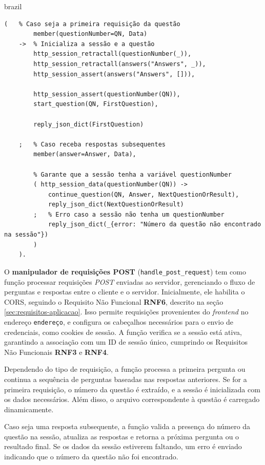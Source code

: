 \begin{otherlanguage*}{brazil}
\begin{lstlisting}[style=ufscthesisx_style, caption={Arquivo \textit{server.pl} - \textit{Handlers} e Manipuladores de requisições}]
    (   % Caso seja a primeira requisição da questão
        member(questionNumber=QN, Data) 
    ->  % Inicializa a sessão e a questão
        http_session_retractall(questionNumber(_)),
        http_session_retractall(answers("Answers", _)),
        http_session_assert(answers("Answers", [])),
        
        http_session_assert(questionNumber(QN)),
        start_question(QN, FirstQuestion),

        reply_json_dict(FirstQuestion)

    ;   % Caso receba respostas subsequentes
        member(answer=Answer, Data),
        
        % Garante que a sessão tenha a variável questionNumber
        ( http_session_data(questionNumber(QN)) ->
            continue_question(QN, Answer, NextQuestionOrResult),
            reply_json_dict(NextQuestionOrResult)
        ;   % Erro caso a sessão não tenha um questionNumber
            reply_json_dict(_{error: "Número da questão não encontrado na sessão"})
        )
    ).
\end{lstlisting}    

O \textbf{manipulador de requisições POST} (\texttt{handle\_post\_request}) tem como função processar requisições \textit{POST} enviadas ao servidor, gerenciando o fluxo de perguntas e respostas entre o cliente e o servidor. Inicialmente, ele habilita o CORS, seguindo o Requisito Não Funcional \textbf{RNF6}, descrito na seção \ref{sec:requisitos-aplicacao}. Isso permite requisições provenientes do \textit{frontend} no endereço \texttt{endereço}, e configura os cabeçalhos necessários para o envio de credenciais, como cookies de sessão. A função verifica se a sessão está ativa, garantindo a associação com um ID de sessão único, cumprindo os Requisitos Não Funcionais \textbf{RNF3} e \textbf{RNF4}.

Dependendo do tipo de requisição, a função processa a primeira pergunta ou continua a sequência de perguntas baseadas nas respostas anteriores. Se for a primeira requisição, o número da questão é extraído, e a sessão é inicializada com os dados necessários. Além disso, o arquivo correspondente à questão é carregado dinamicamente. 

Caso seja uma resposta subsequente, a função valida a presença do número da questão na sessão, atualiza as respostas e retorna a próxima pergunta ou o resultado final. Se os dados da sessão estiverem faltando, um erro é enviado indicando que o número da questão não foi encontrado.


\end{otherlanguage*}
